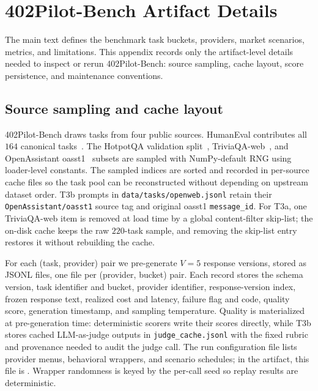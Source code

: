 \section{402Pilot-Bench Artifact Details}
\label{appendix:dataset}

The main text defines the benchmark task buckets, providers, market
scenarios, metrics, and limitations. This appendix records only the
artifact-level details needed to inspect or rerun 402Pilot-Bench:
source sampling, cache layout, score persistence, and maintenance
conventions.

\subsection{Source sampling and cache layout}
\label{app:dataset-sampling}

402Pilot-Bench draws tasks from four public sources. HumanEval contributes
all $164$ canonical tasks~\citep{chen2021humaneval}. The HotpotQA
validation split~\citep{yang2018hotpotqa},
TriviaQA-web~\citep{joshi2017triviaqa}, and OpenAssistant
oasst1~\citep{kopf2023openassistant} subsets are sampled with
NumPy-default RNG using loader-level constants. The sampled indices are
sorted and recorded in per-source cache files so the task pool can be
reconstructed without depending on upstream dataset order. T3b prompts in
\texttt{data/tasks/openweb.jsonl} retain their \texttt{OpenAssistant/oasst1}
source tag and original oasst1 \texttt{message\_id}. For T3a, one
TriviaQA-web item is removed at load time by a global content-filter
skip-list; the on-disk cache keeps the raw $220$-task sample, and removing
the skip-list entry restores it without rebuilding the cache.

For each (task, provider) pair we pre-generate $V = 5$ response versions,
stored as JSONL files, one file per (provider, bucket) pair. Each record
stores the schema version, task identifier and bucket, provider identifier,
response-version index, frozen response text, realized cost and latency,
failure flag and code, quality score, generation timestamp, and sampling
temperature. Quality is materialized at pre-generation time: deterministic
scorers write their scores directly, while T3b stores cached LLM-as-judge
outputs in \texttt{judge\_cache.jsonl} with the fixed rubric and provenance
needed to audit the judge call.
The run configuration file lists provider menus, behavioral wrappers, and
scenario schedules; in the artifact, this file is
. Wrapper randomness is keyed by the per-call
seed so replay results are deterministic.

